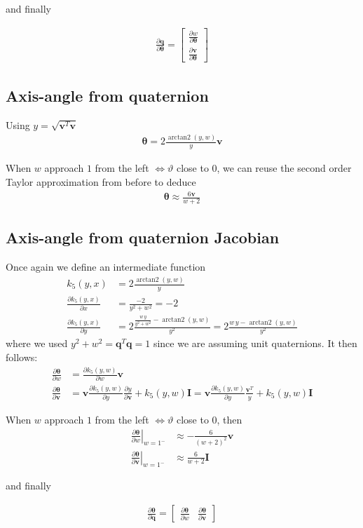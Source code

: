 \documentclass{article}
\renewcommand\aa{\bm{\theta}}
\renewcommand\t{\vartheta}
\newcommand\q{\bm{q}}
\newcommand\I{\bm{I}}
\renewcommand\v{\bm{v}}
\DeclareMathOperator{\arctantwo}{arctan2}
\begin{document}
and finally

\begin{align}
  \frac{\partial \q}{\partial \aa} = 
    \begin{bmatrix}
      \frac{\partial w}{\partial \aa} \\[5pt]
      \frac{\partial \v}{\partial \aa}
    \end{bmatrix}
\end{align}

\subsection{Axis-angle from quaternion}
Using $y=\sqrt{\v^T\v}$
\begin{align}
  \aa = 2 \frac{\arctantwo \left(y, w \right)}{y} \v 
\end{align}

When $w$ approach $1$ from the left $\iff \t$ close to $0$, we can reuse the second order Taylor approximation from before to deduce
\begin{align}
  \aa \approx \frac{6\v}{w+2}
\end{align}

\subsection{Axis-angle from quaternion Jacobian}
Once again we define an intermediate function
\begin{align}
  k_5(y,x) &= 2 \frac{\arctantwo \left(y, w \right)}{y} \\
  \frac{\partial k_5(y,x)}{\partial x} &= \frac{-2}{y^2 + w^2} = -2 \\
  \frac{\partial k_5(y,x)}{\partial y} &= 2 \frac{ \frac{w\,y}{y^2 + w^2} - \arctantwo \left(y, w \right)}{y^2} = 2 \frac{ w\,y - \arctantwo \left(y, w \right)}{y^2}
\end{align}
where we used $y^2 + w^2 = \q^T \q = 1$ since we are assuming unit quaternions. It then follows:
\begin{align}
  \frac{\partial \aa}{\partial w} &= \frac{\partial k_5(y,w)}{\partial w} \v \\
  \frac{\partial \aa}{\partial \v} 
  &= \v \frac{\partial k_5(y,w)}{\partial y} \frac{\partial y}{\partial \v} + k_5(y,w) \I
  =  \v \frac{\partial k_5(y,w)}{\partial y} \frac{\v^T}{y} + k_5(y,w) \I
\end{align}

When $w$ approach $1$ from the left $\iff \t$ close to $0$, then
\begin{align}
  \left. \frac{\partial \aa}{\partial w} \right \vert_{w = 1^-} &\approx - \frac{6}{\left( w + 2 \right)^2} \v \\
  \left. \frac{\partial \aa}{\partial \v} \right \vert_{w = 1^-} &\approx \frac{6}{w + 2} \I
\end{align}

and finally

\begin{align}
  \frac{\partial \aa}{\partial \q} = 
    \begin{bmatrix}
      \frac{\partial \aa}{\partial w} &
      \frac{\partial \aa}{\partial \v}
    \end{bmatrix}
\end{align}


\printbibliography
\end{document}
